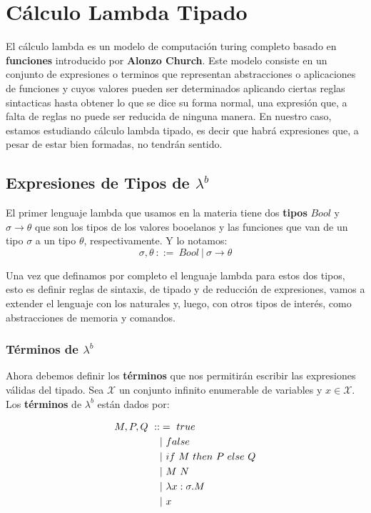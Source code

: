 \section{Cálculo Lambda Tipado}

El cálculo lambda es un modelo de computación turing completo basado en \textbf{funciones} introducido por \textbf{Alonzo Church}. Este modelo consiste en un conjunto de expresiones o terminos que representan abstracciones o aplicaciones de funciones y cuyos valores pueden ser determinados aplicando ciertas reglas sintacticas hasta obtener lo 	que se dice su forma normal, una expresión que, a falta de reglas no puede ser reducida de ninguna manera. En nuestro caso, estamos estudiando cálculo lambda tipado, es decir que habrá expresiones que, a pesar de estar bien formadas, no tendrán sentido.

\subsection{Expresiones de Tipos de \texorpdfstring{$\lambda^b$}{lambda b}}
El primer lenguaje lambda que usamos en la materia tiene dos \textbf{tipos} $Bool$ y $\sigma\rightarrow\theta$ que son los tipos de los valores booelanos y las funciones que van de un tipo $\sigma$ a un tipo $\theta$, respectivamente. Y lo notamos:
\begin{equation*}
	\sigma,\theta ~::=~ Bool ~|~ \sigma\rightarrow\theta
\end{equation*}

Una vez que definamos por completo el lenguaje lambda para estos dos tipos, esto es definir reglas de sintaxis, de tipado y de reducción de expresiones, vamos a extender el lenguaje con los naturales y, luego, con otros tipos de interés, como abstracciones de memoria y comandos.
\subsubsection{Términos de \texorpdfstring{$\lambda^b$}{lambda b}}
Ahora debemos definir los \textbf{términos} que nos permitirán escribir las expresiones válidas del tipado. Sea $\mathcal{X}$ un conjunto infinito enumerable de variables y $x\in\mathcal{X}$. Los \textbf{términos} de $\lambda^b$ están dados por:

\begin{equation*}
\begin{split}
    M, P, Q ~ ::&= ~ true \\
    & |~ false \\
    & |~ if~ M~ then~ P~ else~ Q \\
    & |~ M~N \\
    & |~ \lambda x: \sigma . M \\
    & |~ x
\end{split}
\end{equation*}

